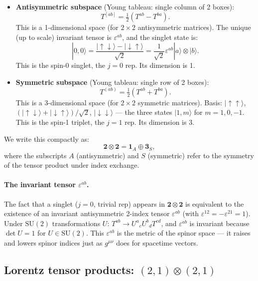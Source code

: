 \documentclass[12pt]{article}
\theoremstyle{remark}
\begin{document}
\begin{itemize}
  \item \textbf{Antisymmetric subspace} (Young tableau: single column of 2 boxes):
  \[
    T^{[ab]} = \tfrac{1}{2}(T^{ab} - T^{ba}).
  \]
  This is a 1-dimensional space (for $2\times 2$ antisymmetric matrices).
  The unique (up to scale) invariant tensor is $\varepsilon^{ab}$, and the singlet state is:
  \[
    |0,0\rangle = \frac{|{\uparrow\downarrow}\rangle - |{\downarrow\uparrow}\rangle}{\sqrt{2}}
    = \frac{1}{\sqrt{2}}\varepsilon^{ab}|a\rangle\otimes|b\rangle.
  \]
  This is the spin-0 singlet, the $j=0$ rep. Its dimension is 1.

  \item \textbf{Symmetric subspace} (Young tableau: single row of 2 boxes):
  \[
    T^{(ab)} = \tfrac{1}{2}(T^{ab} + T^{ba}).
  \]
  This is a 3-dimensional space (for $2\times 2$ symmetric matrices).
  Basis: $|{\uparrow\uparrow}\rangle$,
  $(|{\uparrow\downarrow}\rangle+|{\downarrow\uparrow}\rangle)/\sqrt{2}$,
  $|{\downarrow\downarrow}\rangle$ --- the three states $|1,m\rangle$ for $m=1,0,-1$.
  This is the spin-1 triplet, the $j=1$ rep.  Its dimension is 3.
\end{itemize}

We write this compactly as:
\begin{equation}
  \mathbf{2}\otimes\mathbf{2} = \mathbf{1}_A \oplus \mathbf{3}_S,
  \label{eq:su2_22}
\end{equation}
where the subscripts $A$ (antisymmetric) and $S$ (symmetric) refer to
the symmetry of the tensor product under index exchange.

\paragraph{The invariant tensor $\varepsilon^{ab}$.}
The fact that a singlet ($j=0$, trivial rep) appears in $\mathbf{2}\otimes\mathbf{2}$
is equivalent to the existence of an invariant antisymmetric 2-index tensor
$\varepsilon^{ab}$ (with $\varepsilon^{12}=-\varepsilon^{21}=1$).
Under $\mathrm{SU}(2)$ transformations $U$: $T^{ab} \to U^a{}_c U^b{}_d T^{cd}$,
and $\varepsilon^{ab}$ is invariant because $\det U = 1$ for $U\in\mathrm{SU}(2)$.
This $\varepsilon^{ab}$ is the metric of the spinor space --- it raises and lowers
spinor indices just as $g^{\mu\nu}$ does for spacetime vectors.

\subsection{Lorentz tensor products: \texorpdfstring{$(2,1)\otimes(2,1)$}{(2,1)x(2,1)}}
\end{document}
